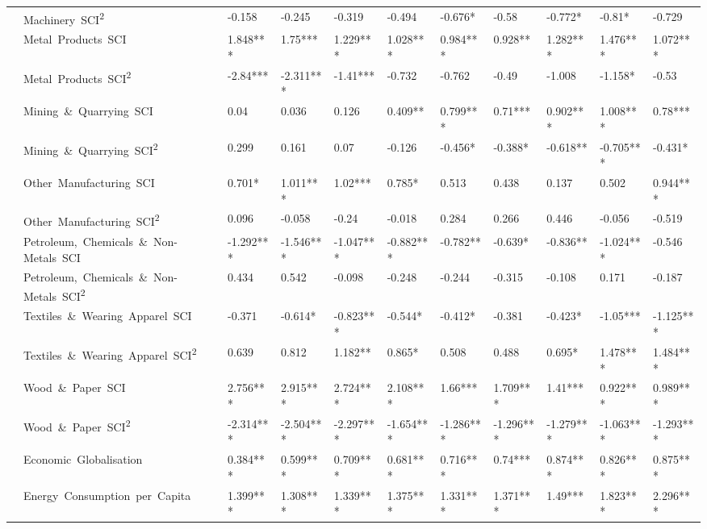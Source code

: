 \documentclass[10pt]{article}
\begin{document}
\begin{table}[ht]
\begin{adjustbox}{width=\textwidth,center}
\begin{tabular}{lllllllllll}
      & Machinery\ SCI\textsuperscript{2} & -0.158 & -0.245 & -0.319 & -0.494 & -0.676* & -0.58 & -0.772* & -0.81* & -0.729 \\
      & Metal\ Products\ SCI & 1.848*** & 1.75*** & 1.229*** & 1.028*** & 0.984*** & 0.928** & 1.282*** & 1.476*** & 1.072*** \\
      & Metal\ Products\ SCI\textsuperscript{2} & -2.84*** & -2.311*** & -1.41*** & -0.732 & -0.762 & -0.49 & -1.008 & -1.158* & -0.53 \\
      & Mining\ \&\ Quarrying\ SCI & 0.04 & 0.036 & 0.126 & 0.409** & 0.799*** & 0.71*** & 0.902*** & 1.008*** & 0.78*** \\
      & Mining\ \&\ Quarrying\ SCI\textsuperscript{2} & 0.299 & 0.161 & 0.07 & -0.126 & -0.456* & -0.388* & -0.618** & -0.705*** & -0.431* \\
      & Other\ Manufacturing\ SCI & 0.701* & 1.011*** & 1.02*** & 0.785* & 0.513 & 0.438 & 0.137 & 0.502 & 0.944*** \\
      & Other\ Manufacturing\ SCI\textsuperscript{2} & 0.096 & -0.058 & -0.24 & -0.018 & 0.284 & 0.266 & 0.446 & -0.056 & -0.519 \\
      & Petroleum,\ Chemicals\ \&\ Non-Metals\ SCI & -1.292*** & -1.546*** & -1.047*** & -0.882*** & -0.782** & -0.639* & -0.836** & -1.024*** & -0.546 \\
      & Petroleum,\ Chemicals\ \&\ Non-Metals\ SCI\textsuperscript{2} & 0.434 & 0.542 & -0.098 & -0.248 & -0.244 & -0.315 & -0.108 & 0.171 & -0.187 \\
      & Textiles\ \&\ Wearing\ Apparel\ SCI & -0.371 & -0.614* & -0.823*** & -0.544* & -0.412* & -0.381 & -0.423* & -1.05*** & -1.125*** \\
      & Textiles\ \&\ Wearing\ Apparel\ SCI\textsuperscript{2} & 0.639 & 0.812 & 1.182** & 0.865* & 0.508 & 0.488 & 0.695* & 1.478*** & 1.484*** \\
      & Wood\ \&\ Paper\ SCI & 2.756*** & 2.915*** & 2.724*** & 2.108*** & 1.66*** & 1.709*** & 1.41*** & 0.922*** & 0.989*** \\
      & Wood\ \&\ Paper\ SCI\textsuperscript{2} & -2.314*** & -2.504*** & -2.297*** & -1.654*** & -1.286*** & -1.296*** & -1.279*** & -1.063*** & -1.293*** \\
      & Economic\ Globalisation & 0.384*** & 0.599*** & 0.709*** & 0.681*** & 0.716*** & 0.74*** & 0.874*** & 0.826*** & 0.875*** \\
      & Energy\ Consumption\ per\ Capita & 1.399*** & 1.308*** & 1.339*** & 1.375*** & 1.331*** & 1.371*** & 1.49*** & 1.823*** & 2.296*** \\

\end{tabular}
\end{adjustbox}
\end{table}
\end{document}

